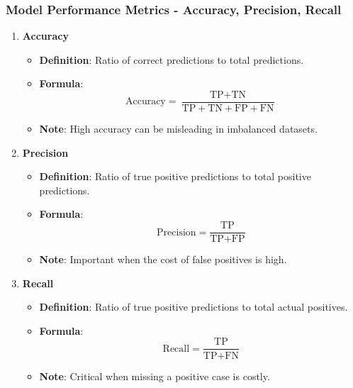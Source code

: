 \documentclass[aspectratio=169]{beamer}
\begin{document}
\begin{frame}[fragile]
    \frametitle{Model Performance Metrics - Accuracy, Precision, Recall}
    \begin{enumerate}
        \item \textbf{Accuracy}
            \begin{itemize}
                \item \textbf{Definition}: Ratio of correct predictions to total predictions.
                \item \textbf{Formula}:
                \begin{equation}
                \text{Accuracy} = \frac{\text{TP} + \text{TN}}{\text{TP} + \text{TN} + \text{FP} + \text{FN}}
                \end{equation}
                \item \textbf{Note}: High accuracy can be misleading in imbalanced datasets.
            \end{itemize}
        
        \item \textbf{Precision}
            \begin{itemize}
                \item \textbf{Definition}: Ratio of true positive predictions to total positive predictions.
                \item \textbf{Formula}:
                \begin{equation}
                \text{Precision} = \frac{\text{TP}}{\text{TP} + \text{FP}}
                \end{equation}
                \item \textbf{Note}: Important when the cost of false positives is high.
            \end{itemize}
        
        \item \textbf{Recall}
            \begin{itemize}
                \item \textbf{Definition}: Ratio of true positive predictions to total actual positives.
                \item \textbf{Formula}:
                \begin{equation}
                \text{Recall} = \frac{\text{TP}}{\text{TP} + \text{FN}}
                \end{equation}
                \item \textbf{Note}: Critical when missing a positive case is costly.
            \end{itemize}
    \end{enumerate}
\end{frame}
\end{document}
